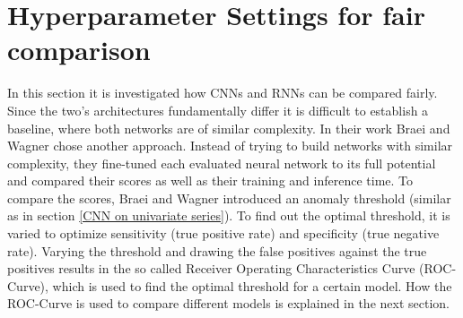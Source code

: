 %
%
%
%


\section{Hyperparameter Settings for fair comparison}
In this section it is investigated how CNNs and RNNs can be compared fairly. Since the two's architectures fundamentally differ it is difficult to establish a baseline, where both networks are of similar complexity. In their work Braei and Wagner \parencite*{Braei2020} chose another approach. Instead of trying to build networks with similar complexity, they fine-tuned each evaluated neural network to its full potential and compared their scores as well as their training and inference time. To compare the scores, Braei and Wagner introduced an anomaly threshold (similar as in section \ref{CNN on univariate series}). To find out the optimal threshold, it is varied to optimize sensitivity (true positive rate) and specificity (true negative rate). Varying the threshold and drawing the false positives against the true positives results in the so called Receiver Operating Characteristics Curve (ROC-Curve), which is used to find the optimal threshold for a certain model. How the ROC-Curve is used to compare different models is explained in the next section.

